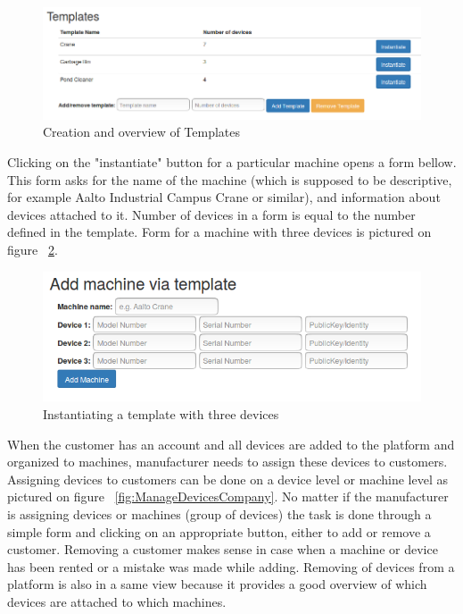 \begin{figure}[ht]
	\begin{center}
		\includegraphics[width=\textwidth]{images/implementation/AddTemplate}
		\caption{Creation and overview of Templates}
		\label{fig:addTemplate}
	\end{center}
\end{figure}

Clicking on the "instantiate" button for a particular machine opens a form bellow. This form asks for the name of the machine (which is supposed to be descriptive, for example Aalto Industrial Campus Crane or similar), and information about devices attached to it. Number of devices in a form is equal to the number defined in the template. Form for a machine with three devices is pictured on figure ~\ref{fig:AddMachineViaTemplate}.

\begin{figure}[ht]
	\begin{center}
		\includegraphics[width=\textwidth]{images/implementation/AddMachineViaTemplate}
		\caption{Instantiating a template with three devices}
		\label{fig:AddMachineViaTemplate}
	\end{center}
\end{figure}

When the customer has an account and all devices are added to the platform and organized to machines, manufacturer needs to assign these devices to customers. Assigning devices to customers can be done on a device level or machine level as pictured on figure ~\ref{fig:ManageDevicesCompany}. No matter if the manufacturer is assigning devices or machines (group of devices) the task is done through a simple form and clicking on an appropriate button, either to add or remove a customer. Removing a customer makes sense in case when a machine or device has been rented or a mistake was made while adding. Removing of devices from a platform is also in a same view because it provides a good overview of which devices are attached to which machines.

